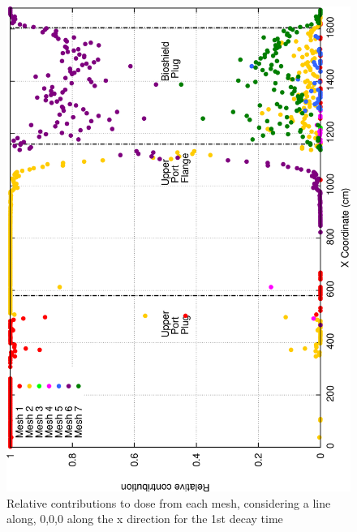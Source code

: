 \documentclass[12pt]{article}
\begin{document}
\begin{figure}[ht!]
\centering
\includegraphics[clip,scale=0.25]{../plots/crosstalk/nob4c/up/dc1_rel.png}
\caption{Relative contributions to dose from each mesh, considering a line along, 0,0,0 along the x direction for the 1st decay time}
\label{fig:ct_up_dc1_rel}
\end{figure}
\end{document}
